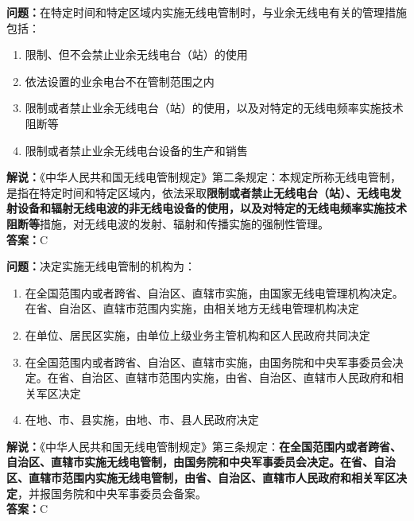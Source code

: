 \documentclass{ctexbook}
\begin{document}
\bigskip


\noindent\textbf{问题：}在特定时间和特定区域内实施无线电管制时，与业余无线电有关的管理措施包括：
\begin{enumerate}[label=\Alph*), leftmargin=3em]
	\item 限制、但不会禁止业余无线电台（站）的使用
	\item 依法设置的业余电台不在管制范围之内
	\item 限制或者禁止业余无线电台（站）的使用，以及对特定的无线电频率实施技术阻断等
	\item 限制或者禁止业余无线电台设备的生产和销售
\end{enumerate}
\noindent\textbf{解说：}《中华人民共和国无线电管制规定》第二条规定：本规定所称无线电管制，是指在特定时间和特定区域内，依法采取\textbf{限制或者禁止无线电台（站）、无线电发射设备和辐射无线电波的非无线电设备的使用，以及对特定的无线电频率实施技术阻断等}措施，对无线电波的发射、辐射和传播实施的强制性管理。\\\noindent\textbf{答案：}C


\bigskip


\noindent\textbf{问题：}决定实施无线电管制的机构为：
\begin{enumerate}[label=\Alph*), leftmargin=3em]
	\item 在全国范围内或者跨省、自治区、直辖市实施，由国家无线电管理机构决定。在省、自治区、直辖市范围内实施，由相关地方无线电管理机构决定
	\item 在单位、居民区实施，由单位上级业务主管机构和区人民政府共同决定
	\item 在全国范围内或者跨省、自治区、直辖市实施，由国务院和中央军事委员会决定。在省、自治区、直辖市范围内实施，由省、自治区、直辖市人民政府和相关军区决定
	\item 在地、市、县实施，由地、市、县人民政府决定
\end{enumerate}
\noindent\textbf{解说：}《中华人民共和国无线电管制规定》第三条规定：\textbf{在全国范围内或者跨省、自治区、直辖市实施无线电管制，由国务院和中央军事委员会决定。在省、自治区、直辖市范围内实施无线电管制，由省、自治区、直辖市人民政府和相关军区决定}，并报国务院和中央军事委员会备案。\\\noindent\textbf{答案：}C


\bigskip
\end{document}
